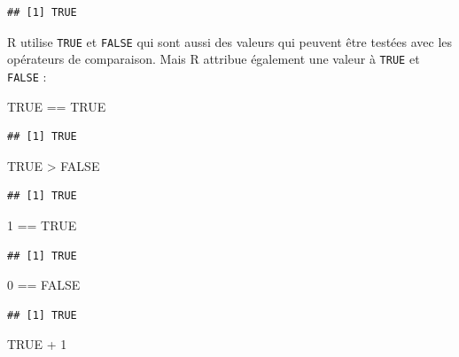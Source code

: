 \documentclass[twoside,symmetric]{book}
\newenvironment{Shaded}{}{}
\newcommand{\DecValTok}[1]{#1}
\newcommand{\OperatorTok}[1]{#1}
\newcommand{\OtherTok}[1]{#1}
\newcommand{\StringTok}[1]{#1}
\begin{document}
\begin{verbatim}
## [1] TRUE
\end{verbatim}

R utilise \texttt{TRUE} et \texttt{FALSE} qui sont aussi des valeurs qui peuvent être testées avec les opérateurs de comparaison. Mais R attribue également une valeur à \texttt{TRUE} et \texttt{FALSE} :

\begin{Shaded}
\begin{Highlighting}[]
\OtherTok{TRUE} \OperatorTok{==}\StringTok{ }\OtherTok{TRUE}
\end{Highlighting}
\end{Shaded}

\begin{verbatim}
## [1] TRUE
\end{verbatim}

\begin{Shaded}
\begin{Highlighting}[]
\OtherTok{TRUE} \OperatorTok{>}\StringTok{ }\OtherTok{FALSE}
\end{Highlighting}
\end{Shaded}

\begin{verbatim}
## [1] TRUE
\end{verbatim}

\begin{Shaded}
\begin{Highlighting}[]
\DecValTok{1} \OperatorTok{==}\StringTok{ }\OtherTok{TRUE}
\end{Highlighting}
\end{Shaded}

\begin{verbatim}
## [1] TRUE
\end{verbatim}

\begin{Shaded}
\begin{Highlighting}[]
\DecValTok{0} \OperatorTok{==}\StringTok{ }\OtherTok{FALSE}
\end{Highlighting}
\end{Shaded}

\begin{verbatim}
## [1] TRUE
\end{verbatim}

\begin{Shaded}
\begin{Highlighting}[]
\OtherTok{TRUE} \OperatorTok{+}\StringTok{ }\DecValTok{1}
\end{Highlighting}
\end{Shaded}
\end{document}
